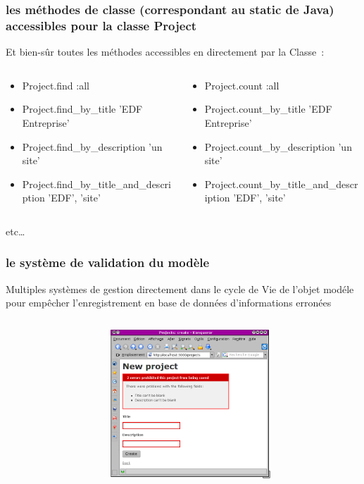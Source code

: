 \documentclass{beamer}
\begin{document}
\begin{frame}
    \frametitle{les méthodes de classe (correspondant au static de Java) accessibles pour la classe Project}
    Et bien-sûr toutes les méthodes accessibles en directement par la Classe~:
    \tiny{}
    \begin{columns}
        \begin{column}[l]{5cm}
            \begin{itemize}
                \item Project.find :all
                \item Project.find\_by\_title 'EDF Entreprise'
                \item Project.find\_by\_description 'un site'
                \item Project.find\_by\_title\_and\_description 'EDF', 'site'
            \end{itemize}
        \end{column}

        \begin{column}[r]{6cm}
            \begin{itemize}
                \item Project.count :all
                \item Project.count\_by\_title 'EDF Entreprise'
                \item Project.count\_by\_description 'un site'
                \item Project.count\_by\_title\_and\_description 'EDF', 'site'
            \end{itemize}
        \end{column}
    \end{columns}
    \normalsize{}
    etc\ldots
\end{frame}

\begin{frame}
    \frametitle{le système de validation du modèle}
    Multiples systèmes de gestion directement dans le cycle de Vie de l'objet
    mod\'ele pour empêcher l'enregistrement en base de
    données d'informations erronées
    \scriptsize{}
    \begin{columns}
        \begin{column}[l]{5cm}
            
        \end{column}

        \begin{column}[r]{5cm}
            \includegraphics[width=60mm]{error_screenshot.png}
        \end{column}
    \end{columns}
\end{frame}
\end{document}
